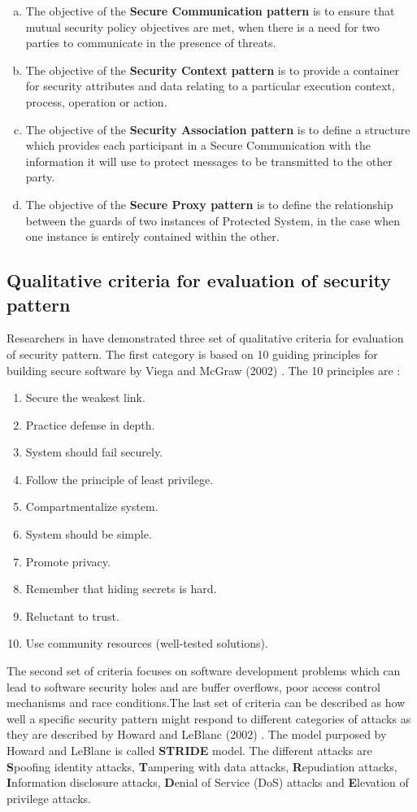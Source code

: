 \documentclass[pdftex,english,oribibl]{llncs}
\begin{document}
\begin{enumerate}[(a)]
	\item{The objective of the \textbf{Secure Communication pattern} is to ensure that mutual security policy objectives are met, when there is a need for two parties to communicate in the presence of threats.}
	\item{The objective of the \textbf{Security Context pattern} is to provide a container for security attributes and data relating to a particular execution context, process, operation or action.}
	\item{The objective of the \textbf{Security Association pattern} is to define a structure which provides each participant in a Secure Communication with the information it will use to protect messages to be transmitted to the other party.}
	\item{The objective of the \textbf{Secure Proxy pattern} is to define the relationship between the guards of two instances of Protected System, in the case when one instance is entirely contained within the other.}
\end{enumerate}

\subsection{Qualitative criteria for evaluation of security pattern}
Researchers in \cite{HALKIDIS2006379} have demonstrated three set of qualitative criteria for evaluation of security pattern. The first category is based on 10 guiding principles for building secure software by Viega and McGraw (2002) \cite{GaryMcGraw2002}. The 10 principles are :
\begin{enumerate}
		\item{Secure the weakest link.}
		\item{Practice defense in depth.}
		\item{System should fail securely.}
		\item{Follow the principle of least privilege.}
		\item{Compartmentalize system.}
		\item{System should be simple.}
		\item{Promote privacy.}
		\item{Remember that hiding secrets is hard.}
		\item{Reluctant to trust.}
		\item{Use community resources (well-tested solutions).}
\end{enumerate}
The second set of criteria focuses on software development problems which can lead to software security holes and are buffer overflows, poor access control mechanisms and race conditions.The last set of criteria can be described as how well a specific security pattern might respond to different categories of attacks as they are described by Howard and LeBlanc (2002) \cite{Howard:2002:WSC:579079}. The model purposed by Howard and LeBlanc is called \textbf{STRIDE} model. The different attacks are \textbf{S}poofing identity attacks, \textbf{T}ampering with data attacks, \textbf{R}epudiation attacks, \textbf{I}nformation disclosure attacks, \textbf{D}enial of Service (DoS) attacks and \textbf{E}levation of privilege attacks.
\end{document}
